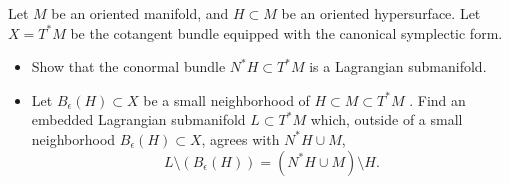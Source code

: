 

	Let $M$ be an oriented manifold, and $H\subset M$ be an oriented hypersurface. Let $X=T^*M$ be the cotangent bundle equipped with the canonical symplectic form. 
	\begin{itemize}
		\item Show that the conormal bundle $N^*H\subset T^*M$ is a Lagrangian submanifold. 
		\item Let $B_\epsilon(H)\subset X$ be a small neighborhood of $H\subset M\subset T^*M$ . Find an embedded Lagrangian submanifold $L\subset T^*M$ which, outside of a small neighborhood $B_\epsilon(H)\subset X$, agrees with $N^*H\cup M$,
		\[ L\setminus (B_\epsilon(H))=(N^*H\cup M)\setminus H.\]
	\end{itemize}

